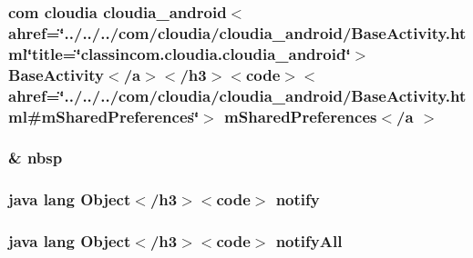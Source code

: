 \hypertarget{_sensor_activity_8html_a5b7f2b6398d46c2bac3442c34be02d25}{
\subsubsection[{m\-Shared\-Preferences$<$/a $>$}]{\setlength{\rightskip}{0pt plus 5cm}com cloudia cloudia\-\_\-android$<$ahref=\char`\"{}../../../com/cloudia/cloudia\-\_\-android/Base\-Activity.\-html\char`\"{}title=\char`\"{}classincom.\-cloudia.\-cloudia\-\_\-android\char`\"{}$>$ Base\-Activity$<$/{\bf a}$>$$<$/h3$>$$<$code$>$$<$ahref=\char`\"{}../../../com/cloudia/cloudia\-\_\-android/Base\-Activity.\-html\#m\-Shared\-Preferences\char`\"{}$>$ m\-Shared\-Preferences$<$/{\bf a} $>$}}\label{_sensor_activity_8html_a5b7f2b6398d46c2bac3442c34be02d25}
\hypertarget{_sensor_activity_8html_aef915316f784c9063d942974538301a6}{
\subsubsection[{nbsp}]{\setlength{\rightskip}{0pt plus 5cm}\& nbsp}}\label{_sensor_activity_8html_aef915316f784c9063d942974538301a6}
\hypertarget{_sensor_activity_8html_ae99ae10b5010594dbda4794e02db271b}{
\subsubsection[{notify}]{\setlength{\rightskip}{0pt plus 5cm}java lang Object$<$/h3$>$$<$code$>$ notify}}\label{_sensor_activity_8html_ae99ae10b5010594dbda4794e02db271b}
\hypertarget{_sensor_activity_8html_a1279357e6e09e33e75b55eb05fdb6436}{
\subsubsection[{notify\-All}]{\setlength{\rightskip}{0pt plus 5cm}java lang Object$<$/h3$>$$<$code$>$ notify\-All}}\label{_sensor_activity_8html_a1279357e6e09e33e75b55eb05fdb6436}
